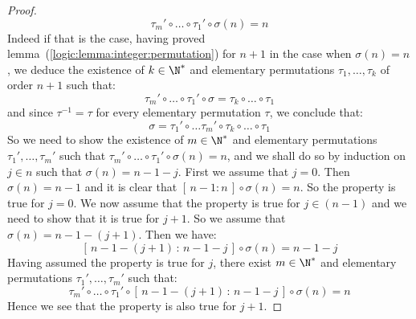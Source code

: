 \begin{proof}
    \[
    \tau_{m}'\circ\ldots\circ\tau_{1}'\circ\sigma(n)=n
    \]
Indeed if that is the case, having proved
lemma~(\ref{logic:lemma:integer:permutation}) for $n+1$ in the case
when $\sigma(n)=n$, we deduce the existence of $k\in\N^{*}$ and
elementary permutations $\tau_{1},\ldots,\tau_{k}$ of order $n+1$
such that:
    \[
    \tau_{m}'\circ\ldots\circ\tau_{1}'\circ\sigma = \tau_{k}\circ\ldots\circ\tau_{1}
    \]
and since $\tau^{-1}=\tau$ for every elementary permutation $\tau$,
we conclude that:
    \[
    \sigma=\tau_{1}'\circ\ldots\tau_{m}'\circ\tau_{k}\circ\ldots\circ\tau_{1}
    \]
So we need to show the existence of $m\in\N^{*}$ and elementary
permutations $\tau_{1}',\ldots ,\tau_{m}'$ such that
$\tau_{m}'\circ\ldots\circ\tau_{1}'\circ\sigma(n)=n$, and we shall
do so by induction on $j\in n$ such that $\sigma(n)=n-1-j$. First we
assume that $j=0$. Then $\sigma(n)=n-1$ and it is clear that
$[\,n-1:n\,]\circ\sigma(n)=n$. So the property is true for $j=0$. We
now assume that the property is true for $j\in (n-1)$ and we need to
show that it is true for $j+1$. So we assume that $\sigma(n)= n-1
-(j+1)$. Then we have:
    \[
    [\,n-1 -(j+1)\,:\,n-1-j\,]\circ\sigma(n)=n-1-j
    \]
Having assumed the property is true for $j$, there exist
$m\in\N^{*}$ and elementary permutations $\tau_{1}',\ldots
,\tau_{m}'$ such that:
    \[
    \tau_{m}'\circ\ldots\circ\tau_{1}'\circ[\,n-1 -(j+1)\,:\,n-1-j\,]\circ\sigma(n)=n
    \]
Hence we see that the property is also true for $j+1$.
\end{proof}

